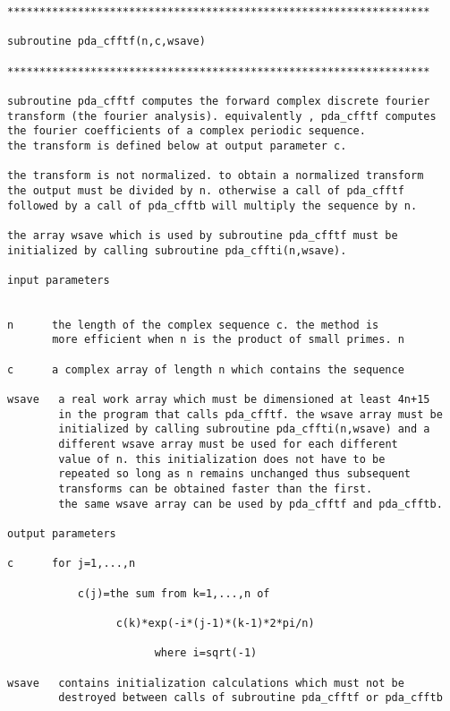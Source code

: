\begin{verbatim}
******************************************************************

subroutine pda_cfftf(n,c,wsave)

******************************************************************

subroutine pda_cfftf computes the forward complex discrete fourier
transform (the fourier analysis). equivalently , pda_cfftf computes
the fourier coefficients of a complex periodic sequence.
the transform is defined below at output parameter c.

the transform is not normalized. to obtain a normalized transform
the output must be divided by n. otherwise a call of pda_cfftf
followed by a call of pda_cfftb will multiply the sequence by n.

the array wsave which is used by subroutine pda_cfftf must be
initialized by calling subroutine pda_cffti(n,wsave).

input parameters


n      the length of the complex sequence c. the method is
       more efficient when n is the product of small primes. n

c      a complex array of length n which contains the sequence

wsave   a real work array which must be dimensioned at least 4n+15
        in the program that calls pda_cfftf. the wsave array must be
        initialized by calling subroutine pda_cffti(n,wsave) and a
        different wsave array must be used for each different
        value of n. this initialization does not have to be
        repeated so long as n remains unchanged thus subsequent
        transforms can be obtained faster than the first.
        the same wsave array can be used by pda_cfftf and pda_cfftb.

output parameters

c      for j=1,...,n

           c(j)=the sum from k=1,...,n of

                 c(k)*exp(-i*(j-1)*(k-1)*2*pi/n)

                       where i=sqrt(-1)

wsave   contains initialization calculations which must not be
        destroyed between calls of subroutine pda_cfftf or pda_cfftb
\end{verbatim}


